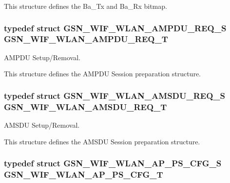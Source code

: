 This structure defines the Ba\_\-Tx and Ba\_\-Rx bitmap. \hypertarget{a00677_gade98eca1b34b9be5633f39a09c50f1d1}{
\subsubsection[{GSN\_\-WIF\_\-WLAN\_\-AMPDU\_\-REQ\_\-T}]{\setlength{\rightskip}{0pt plus 5cm}typedef struct {\bf GSN\_\-WIF\_\-WLAN\_\-AMPDU\_\-REQ\_\-S}  {\bf GSN\_\-WIF\_\-WLAN\_\-AMPDU\_\-REQ\_\-T}}}
\label{a00677_gade98eca1b34b9be5633f39a09c50f1d1}


AMPDU Setup/Removal. 

This structure defines the AMPDU Session preparation structure. \hypertarget{a00677_ga3da66319027a0addea57f579e40c55a6}{
\subsubsection[{GSN\_\-WIF\_\-WLAN\_\-AMSDU\_\-REQ\_\-T}]{\setlength{\rightskip}{0pt plus 5cm}typedef struct {\bf GSN\_\-WIF\_\-WLAN\_\-AMSDU\_\-REQ\_\-S}  {\bf GSN\_\-WIF\_\-WLAN\_\-AMSDU\_\-REQ\_\-T}}}
\label{a00677_ga3da66319027a0addea57f579e40c55a6}


AMSDU Setup/Removal. 

This structure defines the AMSDU Session preparation structure. \hypertarget{a00677_ga5b778f6fbad2d264cc6e8d03a61b7a42}{
\subsubsection[{GSN\_\-WIF\_\-WLAN\_\-AP\_\-PS\_\-CFG\_\-T}]{\setlength{\rightskip}{0pt plus 5cm}typedef struct {\bf GSN\_\-WIF\_\-WLAN\_\-AP\_\-PS\_\-CFG\_\-S} {\bf GSN\_\-WIF\_\-WLAN\_\-AP\_\-PS\_\-CFG\_\-T}}}
\label{a00677_ga5b778f6fbad2d264cc6e8d03a61b7a42}


